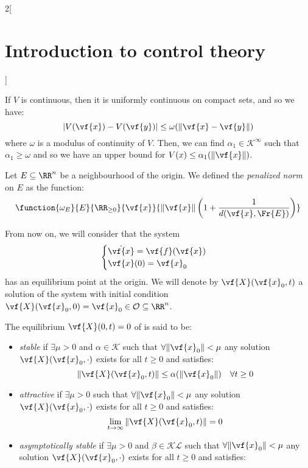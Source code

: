 \documentclass[../../../main_math.tex]{subfiles}
\begin{document}
\begin{multicols}{2}[\section{Introduction to control theory}]
\begin{lemma}
  \end{lemma}
  \begin{remark}
    If $V$ is continuous, then it is uniformly continuous on compact sets, and so we have:
    $$
      \abs{V(\vf{x}) - V(\vf{y})} \leq \omega(\norm{\vf{x}-\vf{y}})
    $$
    where $\omega$ is a modulus of continuity of $V$. Then, we can find $\alpha_1 \in \mathcal{K}^\infty$ such that $\alpha_1\geq \omega$ and so we have an upper bound for $V(x)\leq \alpha_1(\norm{\vf{x}})$.
  \end{remark}
  \begin{definition}
    Let $E\subseteq \RR^n$ be a neighbourhood of the origin. We defined the \emph{penalized norm} on $E$ as the function:
    $$
      \function{\omega_E}{E}{\RR_{\geq 0}}{\vf{x}}{\norm{\vf{x}}\left(1+\frac{1}{d(\vf{x}, \Fr{E})}\right)}
    $$
  \end{definition}
  From now on, we will consider that the system
  \begin{equation}\label{ICT:ode}
    \begin{cases}
      \dot{\vf{x}} = \vf{f}(\vf{x}) \\
      \vf{x}(0) = \vf{x}_0
    \end{cases}
  \end{equation}
  has an equilibrium point at the origin. We will denote by $\vf{X}(\vf{x}_0, t)$ a solution of the system with initial condition $\vf{X}(\vf{x}_0, 0) = \vf{x}_0\in \mathcal{O}\subseteq \RR^n$.
  \begin{definition}
    The equilibrium $\vf{X}(0, t)=0$ of  is said to be:
    \begin{itemize}
      \item \emph{stable} if $\exists\mu>0$ and $\alpha\in\mathcal{K}$ such that $\forall\norm{\vf{x}_0}<\mu$ any solution $\vf{X}(\vf{x}_0, \cdot)$ exists for all $t\geq 0$ and satisfies:
            $$
              \norm{\vf{X}(\vf{x}_0, t)}\leq \alpha(\norm{\vf{x}_0})\quad\forall t\geq 0
            $$
      \item \emph{attractive} if $\exists\mu>0$ such that $\forall\norm{\vf{x}_0}<\mu$ any solution $\vf{X}(\vf{x}_0, \cdot)$ exists for all $t\geq 0$ and satisfies:
            $$
              \lim_{t\to\infty}\norm{\vf{X}(\vf{x}_0, t)}=0
            $$
      \item \emph{asymptotically stable} if $\exists \mu>0$ and $\beta\in \mathcal{KL}$ such that $\forall\norm{\vf{x}_0}<\mu$ any solution $\vf{X}(\vf{x}_0, \cdot)$ exists for all $t\geq 0$ and satisfies:
            $$
$$
\end{itemize}
\end{definition}
\end{multicols}
\end{document}
